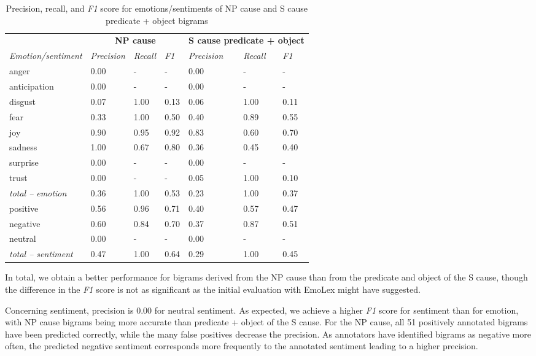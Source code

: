 \begin{table}[]
\centering
\begin{tabular}{l|lll|lll}
\multicolumn{1}{c}{{\bf }} & \multicolumn{3}{c}{{\bf NP cause}} & \multicolumn{3}{c}{{\bf S cause predicate + object}} \\
{\it Emotion/sentiment} & {\it Precision} & {\it Recall} & {\it F1} & {\it Precision} & {\it Recall} & {\it F1} \\\hline
anger & 0.00 & - & - & 0.00 & - & - \\
anticipation & 0.00 & - & - & 0.00 & - & - \\
disgust & 0.07 & 1.00 & 0.13 & 0.06 & 1.00 & 0.11\\
fear & 0.33 & 1.00 & 0.50 & 0.40 & 0.89 & 0.55\\
joy & 0.90 & 0.95 & 0.92 & 0.83 & 0.60 & 0.70\\
sadness & 1.00 & 0.67 & 0.80 & 0.36 & 0.45 & 0.40\\
surprise & 0.00 & - & - & 0.00 & - & - \\
trust & 0.00 & - & - & 0.05 & 1.00 & 0.10 \\\hline
\textit{total -- emotion} & 0.36 & 1.00 & 0.53 & 0.23 & 1.00 & 0.37\\\hline
positive & 0.56 & 0.96 & 0.71 & 0.40 & 0.57 & 0.47\\
negative & 0.60 & 0.84 & 0.70 & 0.37 & 0.87 & 0.51\\
neutral & 0.00 & - & - & 0.00 & - & - \\\hline
\textit{total -- sentiment} & 0.47 & 1.00 & 0.64 & 0.29 & 1.00 & 0.45
\end{tabular}
\caption{Precision, recall, and \textit{F1} score for emotions/sentiments of NP cause and S cause predicate + object bigrams}
\label{tab:bigrams-precision-against-annotation}
\end{table}

In total, we obtain a better performance for bigrams derived from the NP cause than from the predicate and object of the S cause, though the difference in the \textit{F1} score is not as significant as the initial evaluation with EmoLex might have suggested.

Concerning sentiment, precision is 0.00 for neutral sentiment. As expected, we achieve a higher \textit{F1} score for sentiment than for emotion, with NP cause bigrams being more accurate than predicate + object of the S cause. For the NP cause, all 51 positively annotated bigrams have been predicted correctly, while the many false positives decrease the precision. As annotators have identified bigrams as negative more often, the predicted negative sentiment corresponds more frequently to the annotated sentiment leading to a higher precision.

